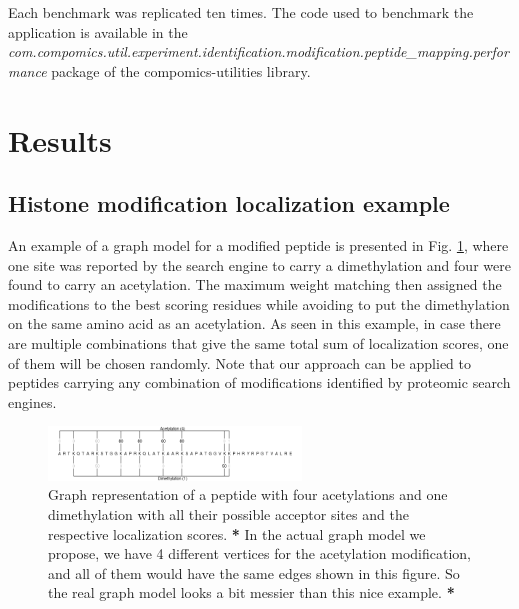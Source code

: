 \documentclass[]{article}
\begin{document}
Each benchmark was replicated ten times. The code used to benchmark the application is available in the \textit{com.compomics.util.experiment.identification.modification.peptide\_mapping.performance} package of the compomics-utilities library.


\section{Results}

\subsection{Histone modification localization example}


 An example of a graph model for a modified peptide is presented in Fig. \ref{fig:histone_peptide}, where one site was reported by the search engine to carry a dimethylation and four were found to carry an acetylation. The maximum weight matching then assigned the modifications to the best scoring residues while avoiding to put the dimethylation on the same amino acid as an acetylation. As seen in this example, in case there are multiple combinations that give the same total sum of localization scores,  one of them will be chosen randomly. Note that our approach can be applied to peptides carrying any combination of modifications identified by proteomic search engines.
 
 
 \begin{figure}[!tpb]
 	\centerline{\includegraphics[width=0.6\textwidth]{figures/figure_histone.png}}
 	\caption{Graph representation of a peptide with four acetylations and one dimethylation with all their possible acceptor sites and the respective localization scores. \textbf{*} In the actual graph model we propose, we have 4 different vertices for the acetylation modification, and all of them would have the same edges shown in this figure. So the real graph model looks a bit messier than this nice example. \textbf{*}}\label{fig:histone_peptide}
 \end{figure}
\end{document}
